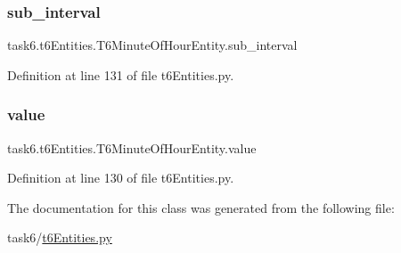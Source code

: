 \subsubsection{\texorpdfstring{sub\+\_\+interval}{sub\_interval}}
{\footnotesize\ttfamily task6.\+t6\+Entities.\+T6\+Minute\+Of\+Hour\+Entity.\+sub\+\_\+interval}



Definition at line 131 of file t6\+Entities.\+py.

\mbox{\label{classtask6_1_1t6Entities_1_1T6MinuteOfHourEntity_abee1ba303976b6122dcf778c9e8763c6}} 
\subsubsection{\texorpdfstring{value}{value}}
{\footnotesize\ttfamily task6.\+t6\+Entities.\+T6\+Minute\+Of\+Hour\+Entity.\+value}



Definition at line 130 of file t6\+Entities.\+py.



The documentation for this class was generated from the following file\+:\begin{DoxyCompactItemize}
\item 
task6/\hyperlink{t6Entities_8py}{t6\+Entities.\+py}\end{DoxyCompactItemize}
